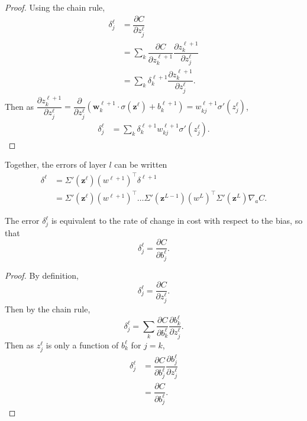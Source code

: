 \begin{proof}
	Using the chain rule,
	\begin{align*}
		\delta_j^\ell & = \dfrac{\partial C}{\partial z_j^\ell} \\
		& = \sum_k\dfrac{\partial C}{\partial z_k^{\ell+1}}\dfrac{\partial z_k^{\ell+1}}{\partial z_j^\ell} \\
		& = \sum_k\delta_k^{\ell+1}\dfrac{\partial z_k^{\ell+1}}{\partial z_j^\ell}.
	\end{align*}
	Then as $\dfrac{\partial z_k^{\ell+1}}{\partial z_j^\ell} = \dfrac{\partial}{\partial z_j^\ell}(\mathbf{w}_k^{\ell+1}\cdot\sigma(\mathbf{z}^\ell) + b_k^{\ell+1}) = w_{kj}^{\ell+1}\sigma'(z_j^\ell)$,
	\begin{align*}
		\delta_j^\ell & = \sum_k\delta_k^{\ell+1}w_{kj}^{\ell+1}\sigma'(z_j^\ell).
	\end{align*}
\end{proof}


Together, the errors of layer $l$ can be written
\begin{align*}
	\delta^\ell & = \Sigma'(\mathbf{z}^\ell)(w^{\ell+1})^\intercal\delta^{\ell+1} \\
	& = \Sigma'(\mathbf{z}^\ell)(w^{\ell+1})^\intercal\ldots\Sigma'(\mathbf{z}^{L-1})(w^L)^\intercal\Sigma'(\mathbf{z}^L)\nabla_aC.
\end{align*}

\begin{proposition}
	The error $\delta_j^\ell$ is equivalent to the rate of change in cost with respect to the bias, so that
	\[
		\delta_j^\ell = \dfrac{\partial C}{\partial b_j^\ell}.
	\]
\end{proposition}
\begin{proof}
	By definition,
	\[
		\delta_j^\ell = \dfrac{\partial C}{\partial z_j^\ell}.
	\]
	Then by the chain rule,
	\[
		\delta_j^\ell = \sum_k\dfrac{\partial C}{\partial b_k^\ell}\dfrac{\partial b_k^\ell}{\partial z_j^\ell}.
	\]
	Then as $z_j^\ell$ is only a function of $b_k^\ell$ for $j = k$,
	\begin{align*}
		\delta_j^\ell & = \dfrac{\partial C}{\partial b_j^\ell}\dfrac{\partial b_j^\ell}{\partial z_j^\ell} \\
		& = \dfrac{\partial C}{\partial b_j^\ell}.
	\end{align*}
\end{proof}

